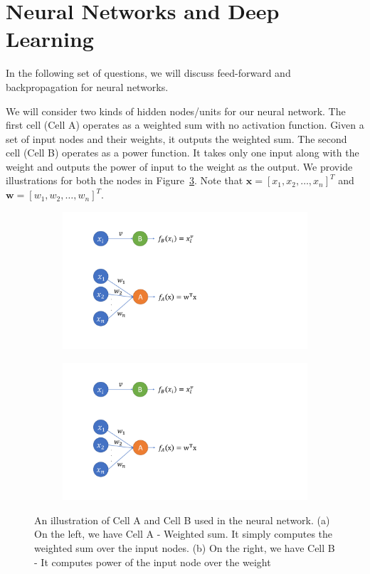 \section{Neural Networks and Deep Learning }

In the following set of questions, we will discuss feed-forward and backpropagation for neural networks.

We will consider two kinds of hidden nodes/units for our neural network. The first cell (Cell A) operates as a weighted sum with no activation function. Given a set of input nodes and their weights, it outputs the weighted sum. The second cell (Cell B) operates as a power function. It takes only one input along with the weight and outputs the power of input to the weight as the output. We provide illustrations for both the nodes in Figure~\ref{fig:nn-nodes}. Note that $\mathbf{x} = [x_1, x_2, \dots, x_n]^T$ and $\mathbf{w} = [w_1, w_2, \dots, w_n]^T$.

\begin{figure}[h]
\centering
\begin{subfigure}{.5\textwidth}
  \centering
  \includegraphics[width=.8\linewidth]{hw2-images/cell-a.pdf}
  \caption{}
  \label{fig:sub1}
\end{subfigure}%
\begin{subfigure}{.5\textwidth}
  \centering
  \includegraphics[width=.8\linewidth]{hw2-images/cell-b.pdf}
  \caption{}
  \label{fig:sub2}
\end{subfigure}
\caption{An illustration of Cell A and Cell B used in the neural network. (a) On the left, we have Cell A - Weighted sum. It simply computes the weighted sum over the input nodes. (b) On the right, we have Cell B - It computes power of the input node over the weight}
\label{fig:nn-nodes}
\end{figure}

